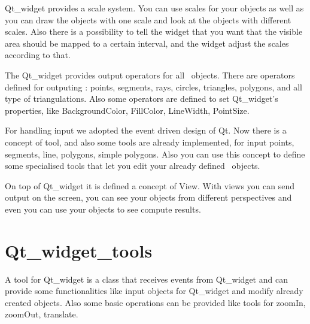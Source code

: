 Qt\_widget provides a scale system. You can use scales for your objects as 
well as you can draw the objects with one scale and look at the objects with 
different scales. Also there is a possibility to tell the widget that you
want that the visible area should be mapped to a certain interval, and the 
widget adjust the scales according to that.

The Qt\_widget provides output operators for all \cgal\ objects. There are 
operators defined for outputing : points, segments, rays, circles, triangles, 
polygons, and all type of triangulations. Also some operators are defined to 
set Qt\_widget's properties, like BackgroundColor, FillColor, LineWidth, 
PointSize.

For handling input we adopted the event driven design of Qt. Now there is a 
concept of tool, and also some tools are already implemented, for input points,
 segments, line, polygons, simple polygons. Also you can use this concept to 
define some specialised tools that let you edit your already defined \cgal\ 
objects.

On top of Qt\_widget it is defined a concept of View. With views you can send 
output on the screen, you can see your objects from different perspectives and 
even you can use your objects to see compute results.

\section{Qt\_widget\_tools}
\label{Qt_widget_tools}

A tool for Qt\_widget is a class that receives events from Qt\_widget and can 
provide some functionalities like input objects for Qt\_widget and modify 
already created objects. Also some basic operations can be provided like tools
for zoomIn, zoomOut, translate.

